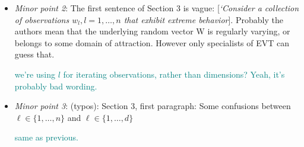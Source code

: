 \documentclass[10pt]{article}
\newcommand{\comment}[1]{\textcolor{teal}{#1}}
\begin{document}
\begin{itemize}
    \item \emph{Minor point 2}: The first sentence of Section 3 is vague: [\emph{‘Consider a 
    collection of observations $w_l, l = 1,\ldots,n$ that exhibit extreme behavior}].  Probably the
    authors mean that the underlying random vector W is regularly varying, or belongs to some domain 
    of attraction. However only specialists of EVT can guess that.

    \comment{we're using $l$ for iterating observations, rather than dimensions?  Yeah, it's probably
    bad wording.}

    \item \emph{Minor point 3}: (typos): Section 3, first paragraph: Some confusions between 
        $\ell \in \lbrace 1,\ldots, n\rbrace$ and $\ell \in \lbrace 1,\ldots,d\rbrace$

    \comment{same as previous.}
\end{itemize}


\end{document}
